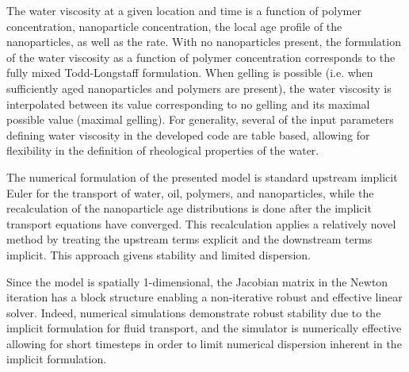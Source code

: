 \documentclass[journal = enfuem, manuscript =  article]{achemso}
\begin{document}
The water viscosity at a given location and time is a function of polymer concentration, nanoparticle concentration, the local age profile of the nanoparticles, as well as the rate. With no nanoparticles present, the formulation of the water viscosity as a function of polymer concentration corresponds to the fully mixed Todd-Longstaff formulation. When gelling is possible (i.e. when sufficiently aged nanoparticles and polymers are present), the water viscosity is interpolated between its value corresponding to no gelling and its maximal possible value (maximal gelling).  For generality, several of the input parameters defining water viscosity in the developed code are table based, allowing for flexibility in the definition of rheological properties of the water.

The numerical formulation of the presented model is standard upstream implicit Euler for the transport of water, oil, polymers, and nanoparticles, while the recalculation of the nanoparticle age distributions is done after the implicit transport equations have converged. This recalculation applies a relatively novel method \citep{Flatten2008} by treating the upstream terms explicit and the downstream terms implicit. This approach givens stability and limited dispersion. 

Since the model is spatially 1-dimensional, the Jacobian matrix in the Newton iteration has a block structure enabling a non-iterative robust and effective linear solver. Indeed, numerical simulations demonstrate robust stability due to the implicit formulation for fluid transport, and the simulator is numerically effective allowing for short timesteps in order to limit numerical dispersion inherent in the implicit formulation.

\end{document}
